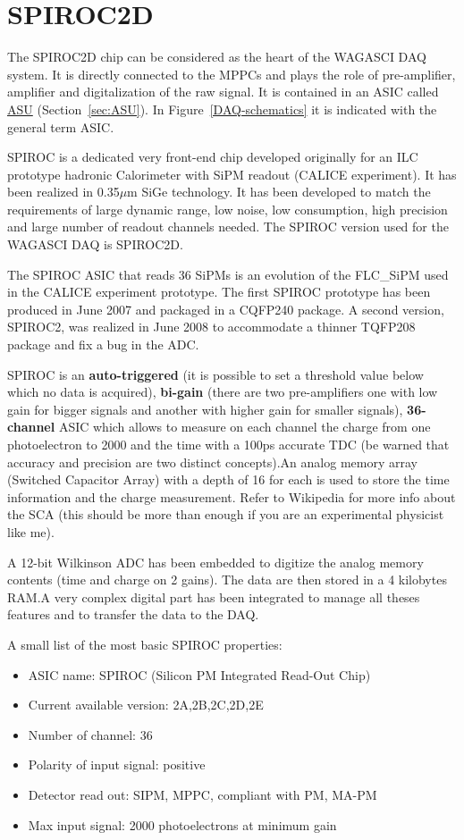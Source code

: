   \section{SPIROC2D}
  The SPIROC2D chip can be considered as the heart of the WAGASCI DAQ system. It
  is directly connected to the MPPCs and plays the role of pre-amplifier,
  amplifier and digitalization of the raw signal. It is contained in an ASIC
  called \hyperref[sec:ASU]{ASU} (Section~\ref{sec:ASU}). In
  Figure~\ref{DAQ-schematics} it is indicated with the general term ASIC.
  
  SPIROC is a dedicated very front-end chip developed originally for an ILC
  prototype hadronic Calorimeter with SiPM readout (CALICE experiment). It has
  been realized in 0.35$\mu$m SiGe technology. It has been developed to match
  the requirements of large dynamic range, low noise, low consumption, high
  precision and large number of readout channels needed. The SPIROC version used
  for the WAGASCI DAQ is SPIROC2D.

  The SPIROC ASIC that reads 36 SiPMs is an evolution of the FLC\_SiPM used in
  the CALICE experiment prototype. The first SPIROC prototype has been produced
  in June 2007 and packaged in a CQFP240 package. A second version, SPIROC2, was
  realized in June 2008 to accommodate a thinner TQFP208 package and fix a bug
  in the ADC.

  SPIROC is an \textbf{auto-triggered} (it is possible to set a threshold value
  below which no data is acquired), \textbf{bi-gain} (there are two
  pre-amplifiers one with low gain for bigger signals and another with higher
  gain for smaller signals), \textbf{36-channel} ASIC which allows to measure on
  each channel the charge from one photoelectron to 2000 and the time with a
  100ps accurate TDC (be warned that accuracy and precision are two distinct
  concepts).\@ An analog memory array (Switched Capacitor Array) with a depth of
  16 for each is used to store the time information and the charge
  measurement. Refer to Wikipedia for more info about the SCA (this should be
  more than enough if you are an experimental physicist like me).

  A 12-bit Wilkinson ADC has been embedded to digitize the analog memory
  contents (time and charge on 2 gains). The data are then stored in a 4
  kilobytes RAM.\@ A very complex digital part has been integrated to manage all
  theses features and to transfer the data to the DAQ.\@

  A small list of the most basic SPIROC properties:
  \begin{itemize}
  \item ASIC name: SPIROC (Silicon PM Integrated Read-Out Chip)
  \item Current available version: 2A,2B,2C,2D,2E
  \item Number of channel: 36
  \item Polarity of input signal: positive
  \item Detector read out: SIPM, MPPC, compliant with PM, MA-PM
  \item Max input signal: 2000 photoelectrons at minimum gain
  \end{itemize}

